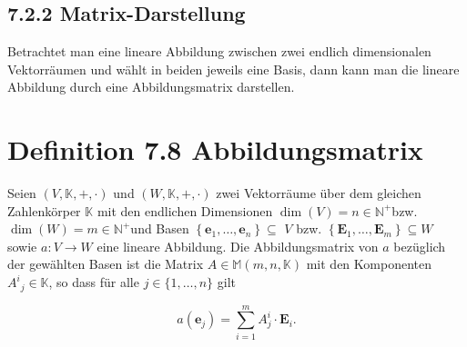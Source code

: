 \documentclass[10pt]{article}
\begin{document}
\subsection*{7.2.2 Matrix-Darstellung}
Betrachtet man eine lineare Abbildung zwischen zwei endlich dimensionalen Vektorräumen und wählt in beiden jeweils eine Basis, dann kann man die lineare Abbildung durch eine Abbildungsmatrix darstellen.

\section*{Definition 7.8 Abbildungsmatrix}
Seien $(V, \mathbb{K},+, \cdot)$ und $(W, \mathbb{K},+, \cdot)$ zwei Vektorräume über dem gleichen Zahlenkörper $\mathbb{K}$ mit den endlichen Dimensionen $\operatorname{dim}(V)=n \in \mathbb{N}^{+}$bzw. $\operatorname{dim}(W)=m \in \mathbb{N}^{+}$und Basen $\left\{\mathbf{e}_{1}, \ldots, \mathbf{e}_{n}\right\} \subseteq$ $V$ bzw. $\left\{\mathbf{E}_{1}, \ldots, \mathbf{E}_{m}\right\} \subseteq W$ sowie $a: V \rightarrow W$ eine lineare Abbildung. Die Abbildungsmatrix von $a$ bezüglich der gewählten Basen ist die Matrix $A \in \mathbb{M}(m, n, \mathbb{K})$ mit den Komponenten $A^{i}{ }_{j} \in \mathbb{K}$, so dass für alle $j \in\{1, \ldots, n\}$ gilt


\begin{equation*}
a\left(\mathbf{e}_{j}\right)=\sum_{i=1}^{m} A_{j}^{i} \cdot \mathbf{E}_{i} . \tag{7.37}
\end{equation*}
\end{document}
